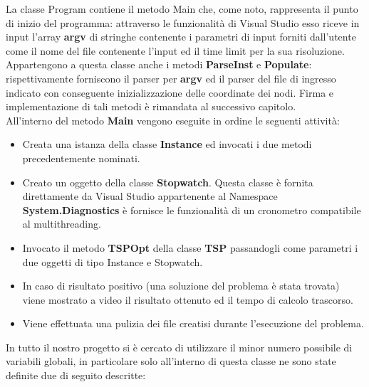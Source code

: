 \documentclass[11pt]{article}
\begin{document}
La classe Program contiene il metodo Main che, come noto, rappresenta il punto di inizio del programma: attraverso le funzionalità di Visual Studio esso riceve in input l'array \textbf{argv} di stringhe contenente i parametri di input forniti dall'utente come il nome del file contenente l'input ed il time limit per la sua risoluzione. Appartengono a questa classe anche i metodi \textbf{ParseInst} e \textbf{Populate}: rispettivamente forniscono il parser per \textbf{argv} ed il parser del file di ingresso indicato con conseguente inizializzazione delle coordinate dei nodi. Firma e implementazione di tali metodi \`e rimandata al successivo capitolo.\\
All'interno del metodo \textbf{Main} vengono eseguite in ordine le seguenti attività:
\begin{itemize}
	\item Creata una istanza della classe \textbf{Instance} ed invocati i due metodi precedentemente nominati.
	\item Creato un oggetto della classe \textbf{Stopwatch}. Questa classe è fornita direttamente da Visual Studio appartenente al Namespace \textbf{System.Diagnostics} è fornisce le funzionalità di un cronometro compatibile al multithreading.
	\item Invocato il metodo \textbf{TSPOpt} della classe \textbf{TSP} passandogli come parametri i due oggetti di tipo Instance e Stopwatch.
	\item In caso di risultato positivo (una soluzione del problema è stata trovata) viene mostrato a video il risultato ottenuto ed il tempo di calcolo trascorso.
	\item Viene effettuata una pulizia dei file creatisi durante l'esecuzione del problema.
\end{itemize}

In tutto il nostro progetto si è cercato di utilizzare il minor numero possibile di variabili globali, in particolare solo all'interno di questa classe ne sono state definite due di seguito descritte:
\end{document}
